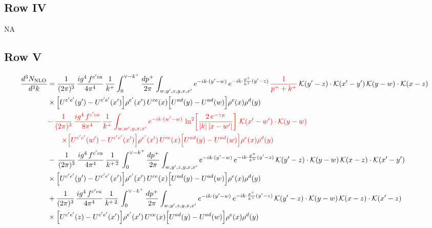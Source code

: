 \documentclass[9pt]{article}
\numberwithin{equation}{section}
\newcommand{\chg}[1]{{\color{red}#1}}
\begin{document}
\subsection{Row IV}
\textsc{NA}
\subsection{Row V}
\begin{align}
\frac{d^{3}N_{\rm NLO}}{d^{3}k} & = \frac{1}{(2\pi)^{3}}\,\frac{ig^{4}\,f^{c'ca}}{4\pi^{4}}\,\frac{1}{k^{+}}\int_{0}^{\vee-k^{+}}\frac{dp^{+}}{2\pi}\int_{w,y',z,y,x,x'}e^{-ik\cdot(y'-w)}\,e^{-ik\cdot\frac{p^{+}}{k^{+}}(y'-z)}\,\chg{\frac{1}{p^{+}+k^{+}}}\,\mathcal{K}(y'-z)\cdot\mathcal{K}(x'-y')\,\mathcal{K}(y-w)\cdot\mathcal{K}(x-z)\notag \\ & \times\Big[U^{c'e'}(y')-U^{c'e'}(x')\Big]\rho^{e'}(x')\,U^{ce}(x)\Big[U^{ad}(y)-U^{ad}(w)\Big]\rho^{e}(x)\rho^{d}(y)\notag\\
&\chg{-\,\frac{1}{(2\pi)^{3}}\,\frac{ig^{4}\,f^{c'ca}}{8\pi^{4}}\,\frac{1}{k^{+}}\int_{w,w',y,x,x'}e^{-ik\cdot(w'-w)}\,\ln^{2}\!\left[\frac{2\,e^{-\gamma_{E}}}{|k|\,|x-w'|}\right]\,\mathcal{K}(x'-w')\cdot\mathcal{K}(y-w)}\notag\\
&\chg{\qquad\times\Big[U^{c'e'}(w')-U^{c'e'}(x')\Big]\rho^{e'}(x')\,U^{ce}(x)\Big[U^{ad}(y)-U^{ad}(w)\Big]\rho^{e}(x)\rho^{d}(y)}\notag\\
&-\,\frac{1}{(2\pi)^{3}}\,\frac{ig^{4}\,f^{c'ca}}{4\pi^{4}}\,\frac{1}{k^{+\,2}}\,\int_{0}^{\vee-k^{+}}\frac{dp^{+}}{2\pi}\int_{w,y',z,y,x,x'}e^{-ik\cdot(y'-w)}\,e^{-ik\cdot\frac{p^{+}}{k^{+}}(y'-z)}\,\mathcal{K}(y'-z)\cdot\mathcal{K}(y-w)\,\mathcal{K}(x-z)\cdot\mathcal{K}(x'-y')\notag \\ & \times\Big[U^{c'e'}(y')-U^{c'e'}(x')\Big]\rho^{e'}(x')\,U^{ce}(x)\Big[U^{ad}(y)-U^{ad}(w)\Big]\rho^{e}(x)\rho^{d}(y)\notag\\
&+\frac{1}{(2\pi)^{3}}\,\frac{ig^{4}\,f^{c'ca}}{4\pi^{4}}\,\frac{1}{k^{+\,2}}\,\int_{0}^{\vee-k^{+}}\frac{dp^{+}}{2\pi}\int_{w,y',z,y,x,x'}e^{-ik\cdot(y'-w)}\,e^{-ik\cdot\frac{p^{+}}{k^{+}}(y'-z)}\,\mathcal{K}(y'-z)\cdot\mathcal{K}(y-w)\,\mathcal{K}(x-z)\cdot\mathcal{K}(x'-z)\notag \\ & \times\Big[U^{c'e'}(z)-U^{c'e'}(x')\Big]\rho^{e'}(x')\,U^{ce}(x)\Big[U^{ad}(y)-U^{ad}(w)\Big]\rho^{e}(x)\rho^{d}(y)
\end{align}
\end{document}
